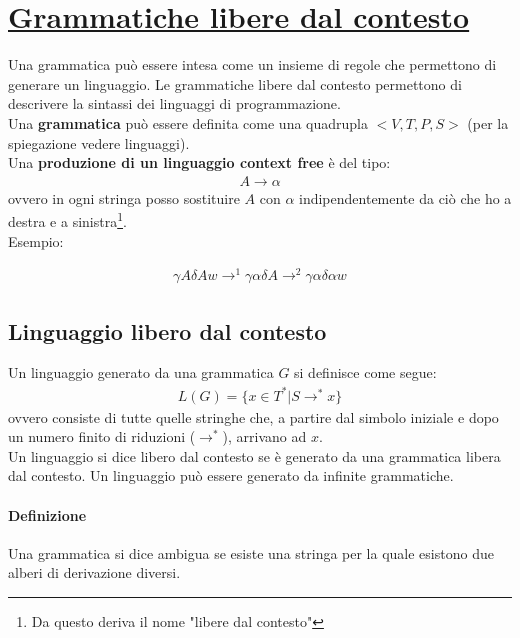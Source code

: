 \documentclass[a4paper, 10pt]{report}
\begin{document}
\section*{\underline{Grammatiche libere dal contesto}}
Una grammatica può essere intesa come un insieme di regole che permettono di generare un linguaggio. Le grammatiche libere dal contesto permettono di descrivere la sintassi dei linguaggi di programmazione.\\

\noindent Una \textbf{grammatica} può essere definita come una quadrupla $<V, T, P, S>$ (per la spiegazione vedere linguaggi).\\

\noindent Una \textbf{produzione di un linguaggio context free} è del tipo:
\begin{align*}
A \rightarrow \alpha
\end{align*}
\noindent ovvero in ogni stringa posso sostituire $A$ con $\alpha$ indipendentemente da ciò che ho a destra e a sinistra\footnote{Da questo deriva il nome "libere dal contesto"}.\\

\noindent Esempio:

\begin{align*}
\gamma A \delta A w \rightarrow^1 \gamma \alpha \delta A \rightarrow^2 \gamma \alpha \delta \alpha w
\end{align*}

\subsection*{Linguaggio libero dal contesto}
Un linguaggio generato da una grammatica $G$ si definisce come segue:
\begin{align*}
L(G) = \{x \in T^* | S \rightarrow^* x\}
\end{align*}
\noindent ovvero consiste di tutte quelle stringhe che, a partire dal simbolo iniziale e dopo un numero finito di riduzioni ($\rightarrow^*$), arrivano ad $x$.\\

\noindent Un linguaggio si dice libero dal contesto se è generato da una grammatica libera dal contesto. Un linguaggio può essere generato da infinite grammatiche.

\paragraph*{Definizione} Una grammatica si dice ambigua se esiste una stringa per la quale esistono due alberi di derivazione diversi.\\
\end{document}

